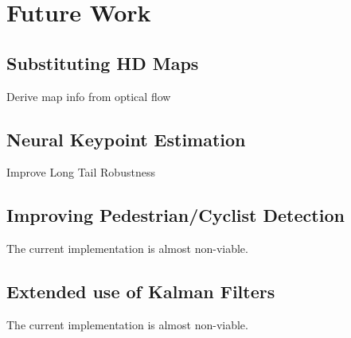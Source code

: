 
\chapter{Future Work}
\label{ch:future}

\section{Substituting HD Maps}
\label{sec:nomap}

Derive map info from optical flow

\section{Neural Keypoint Estimation}
\label{sec:neuralkeypoints}

Improve Long Tail Robustness

\section{Improving Pedestrian/Cyclist Detection}
\label{sec:improvepedcyclist}

The current implementation is almost non-viable.

\section{Extended use of Kalman Filters}
\label{sec:extkalman}

The current implementation is almost non-viable.
